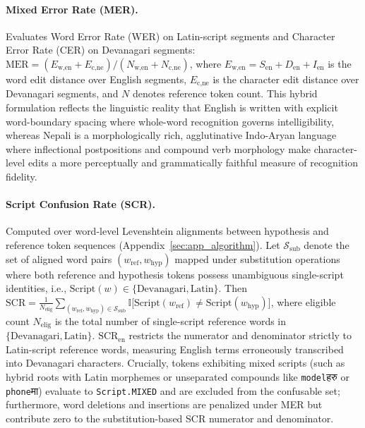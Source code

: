 \documentclass[10pt,twocolumn,a4paper]{article}
\newcommand{\dev}[1]{{\devfont #1}}
\newcommand{\SCRen}{\text{SCR}_{\text{en}}}
\begin{document}
\paragraph{Mixed Error Rate (MER).}
Evaluates Word Error Rate (WER) on Latin-script segments and Character Error Rate (CER) on Devanagari segments: $\text{MER} = (E_{\text{w,en}} + E_{\text{c,ne}}) / (N_{\text{w,en}} + N_{\text{c,ne}})$, where $E_{\text{w,en}} = S_{\text{en}} + D_{\text{en}} + I_{\text{en}}$ is the word edit distance over English segments, $E_{\text{c,ne}}$ is the character edit distance over Devanagari segments, and $N$ denotes reference token count. This hybrid formulation reflects the linguistic reality that English is written with explicit word-boundary spacing where whole-word recognition governs intelligibility, whereas Nepali is a morphologically rich, agglutinative Indo-Aryan language where inflectional postpositions and compound verb morphology make character-level edits a more perceptually and grammatically faithful measure of recognition fidelity.

\paragraph{Script Confusion Rate (SCR).}
Computed over word-level Levenshtein alignments between hypothesis and reference token sequences (Appendix~\ref{sec:app_algorithm}). Let $\mathcal{S}_{\text{sub}}$ denote the set of aligned word pairs $(w_{\text{ref}}, w_{\text{hyp}})$ mapped under substitution operations where both reference and hypothesis tokens possess unambiguous single-script identities, i.e., $\text{Script}(w) \in \{\text{Devanagari}, \text{Latin}\}$. Then $\text{SCR} = \frac{1}{N_{\text{elig}}} \sum_{(w_{\text{ref}}, w_{\text{hyp}}) \in \mathcal{S}_{\text{sub}}} \mathbb{I}\bigl[\text{Script}(w_{\text{ref}}) \neq \text{Script}(w_{\text{hyp}})\bigr]$, where eligible count $N_{\text{elig}}$ is the total number of single-script reference words in $\{\text{Devanagari}, \text{Latin}\}$. $\SCRen$ restricts the numerator and denominator strictly to Latin-script reference words, measuring English terms erroneously transcribed into Devanagari characters. Crucially, tokens exhibiting mixed scripts (such as hybrid roots with Latin morphemes or unseparated compounds like \texttt{model}\dev{हरु} or \texttt{phone}\dev{मा}) evaluate to \texttt{Script.MIXED} and are excluded from the confusable set; furthermore, word deletions and insertions are penalized under MER but contribute zero to the substitution-based SCR numerator and denominator.
\end{document}
